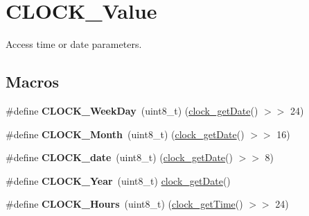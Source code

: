 \hypertarget{group___c_l_o_c_k___value}{}\section{C\+L\+O\+C\+K\+\_\+\+Value}
\label{group___c_l_o_c_k___value}


Access time or date parameters.  


\subsection*{Macros}
\begin{DoxyCompactItemize}
\item 
\mbox{\label{group___c_l_o_c_k___value_ga41cab09c59fe3cc9a25719ec3be3fd4d}} 
\#define {\bfseries C\+L\+O\+C\+K\+\_\+\+Week\+Day}~(uint8\+\_\+t) (\hyperlink{group___clock___time___date_gabb4d72928cb3d131d40067fb141003aa}{clock\+\_\+get\+Date}() $>$$>$ 24)
\item 
\mbox{\label{group___c_l_o_c_k___value_gabd717170aa836b16355413e2c5ca0ad8}} 
\#define {\bfseries C\+L\+O\+C\+K\+\_\+\+Month}~(uint8\+\_\+t) (\hyperlink{group___clock___time___date_gabb4d72928cb3d131d40067fb141003aa}{clock\+\_\+get\+Date}() $>$$>$ 16)
\item 
\mbox{\label{group___c_l_o_c_k___value_gaad5816af032bcc19c84bc93e03f42236}} 
\#define {\bfseries C\+L\+O\+C\+K\+\_\+date}~(uint8\+\_\+t) (\hyperlink{group___clock___time___date_gabb4d72928cb3d131d40067fb141003aa}{clock\+\_\+get\+Date}() $>$$>$ 8)
\item 
\mbox{\label{group___c_l_o_c_k___value_ga35866274a21e8d3c0223c465209f3d74}} 
\#define {\bfseries C\+L\+O\+C\+K\+\_\+\+Year}~(uint8\+\_\+t) \hyperlink{group___clock___time___date_gabb4d72928cb3d131d40067fb141003aa}{clock\+\_\+get\+Date}()
\item 
\mbox{\label{group___c_l_o_c_k___value_ga49ea807900604714bab70a531081ac6a}} 
\#define {\bfseries C\+L\+O\+C\+K\+\_\+\+Hours}~(uint8\+\_\+t) (\hyperlink{group___clock___time___date_ga03ae6948083c259f6edc0b146f40dc62}{clock\+\_\+get\+Time}() $>$$>$ 24)
\item 
\mbox{\label{group___c_l_o_c_k___value_ga302d9ee9e79c96969e558b9ffdba3212}} 

\end{DoxyCompactItemize}

